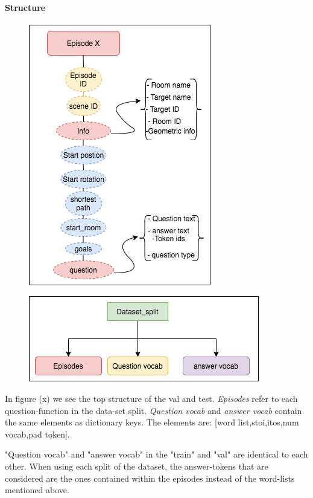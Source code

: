 \paragraph{Structure}

\begin{figure}[H]
\includegraphics[scale=0.5]{images/episode1.png}
\label{fig:episode}
\caption{}
\includegraphics[scale=0.5]{images/datasplit1.png}
\label{fig:datasplit}
\caption{}
\end{figure}

In figure (x) we see the top structure of the val and test. \textit{Episodes} refer to each question-function in the data-set split. \textit{Question vocab} and \textit{answer vocab} contain the same elements as dictionary keys. The elements are: [word list,stoi,itos,num vocab,pad token].

"Question vocab" and "answer vocab" in the "train" and "val" are identical to each other. When using each split of the dataset, the answer-tokens that are considered are the ones contained within the episodes instead of the word-lists mentioned above. 

